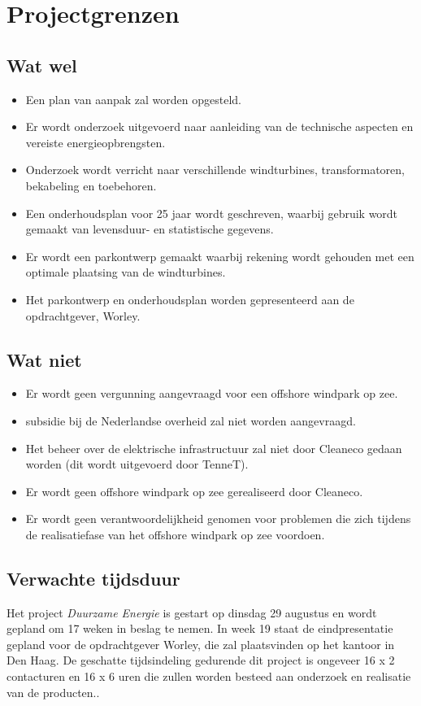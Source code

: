 \section{Projectgrenzen}
\subsection{Wat wel}
\begin{itemize}
\item Een plan van aanpak zal worden opgesteld.
\item Er wordt onderzoek uitgevoerd naar aanleiding van de technische aspecten en vereiste energieopbrengsten.
\item Onderzoek wordt verricht naar verschillende windturbines, transformatoren, bekabeling en toebehoren.
\item Een onderhoudsplan voor 25 jaar wordt geschreven, waarbij gebruik wordt gemaakt van levensduur- en statistische gegevens.
\item Er wordt een parkontwerp gemaakt waarbij rekening wordt gehouden met een optimale plaatsing van de windturbines.
\item Het parkontwerp en onderhoudsplan worden gepresenteerd aan de opdrachtgever, Worley.
\end{itemize}
\subsection{Wat niet}
\begin{itemize}
\item Er wordt geen vergunning aangevraagd voor een \gls{offshore} windpark op zee.
\item \gls{subsidie} bij de Nederlandse overheid zal niet worden aangevraagd.
\item Het beheer over de elektrische infrastructuur zal niet door Cleaneco gedaan worden (dit wordt uitgevoerd door TenneT\cite{energieakkoord}).
\item Er wordt geen \gls{offshore} windpark op zee gerealiseerd door Cleaneco.
\item Er wordt geen verantwoordelijkheid genomen voor problemen die zich tijdens de realisatiefase van het \gls{offshore} windpark op zee voordoen.
\end{itemize}
\subsection{Verwachte tijdsduur}
Het project \textit{Duurzame Energie} is gestart op dinsdag 29 augustus en wordt gepland om 17 weken in beslag te nemen. In week 19 staat de eindpresentatie gepland voor de opdrachtgever Worley, die zal plaatsvinden op het kantoor in Den Haag. De geschatte tijdsindeling gedurende dit project is ongeveer 16 x 2 contacturen en 16 x 6 uren die zullen worden besteed aan onderzoek en realisatie van de producten.\cite{studiewijzer}.

